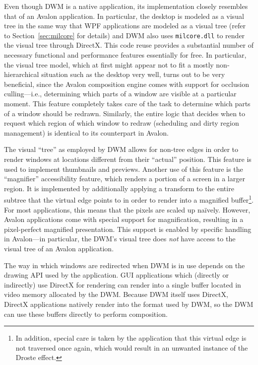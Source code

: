 			Even though DWM is a native application, its implementation closely
			resembles that of an Avalon application. In particular, the desktop
			is modeled as a visual tree in the same way that WPF applications
			are modeled as a visual tree (refer to Section~\ref{sec:milcore}
			for details) and DWM also uses \texttt{milcore.dll} to render the
			visual tree through DirectX. This code reuse provides a
			substantial number of necessary functional and performance
			features essentially for free.  In particular, the visual tree
			model, which at first might appear not to fit a mostly
			non-hierarchical situation such as the desktop very well,
			turns out to be very beneficial, since the Avalon composition
			engine comes with support for occlusion culling---i.e.,
			determining which parts of a window are visible at a particular
			moment. This feature completely takes care of the task to
			determine which parts of a window should be redrawn. Similarly, the
			entire logic that decides when to request which region of which window
			to redraw (scheduling and dirty region management) is identical to
			its counterpart in Avalon.
			\cite{dwmwpf}

			The visual \enquote{tree} as employed by DWM allows for non-tree edges
			in order to render windows at locations different from their \enquote{actual}
			position. This feature is used to implement thumbnails and previews.
			Another use of this feature is the \enquote{magnifier} accessibility
			feature, which renders a portion of a screen in a larger region.
			It is implemented by additionally applying a transform to the entire
			subtree that the virtual edge points to in order to render into a
			magnified buffer\footnote{In addition, special care is taken by the
			application
			that this virtual edge is not traversed once again, which would result
			in an unwanted instance of the Droste effect.}. %
			For most applications, this means that the pixels are scaled up naïvely.
			However, Avalon applications come with special support for magnification,
			resulting in a pixel-perfect magnified presentation. This support
			is enabled by specific handling in Avalon---in particular, the DWM's
			visual tree does \emph{not} have access to the visual tree of an
			Avalon application.
			\cite{goingdeep}

			The way in which windows are redirected when DWM is in use depends
			on the drawing API used by the application. GUI applications which
			(directly or indirectly)
			use DirectX for rendering can render into a single buffer located
			in video memory allocated
			by the DWM. Because DWM itself uses DirectX, DirectX applications
			natively render into the format used by DWM, so the DWM can use
			these buffers directly to perform composition.
			\cite{dwmredirect}

